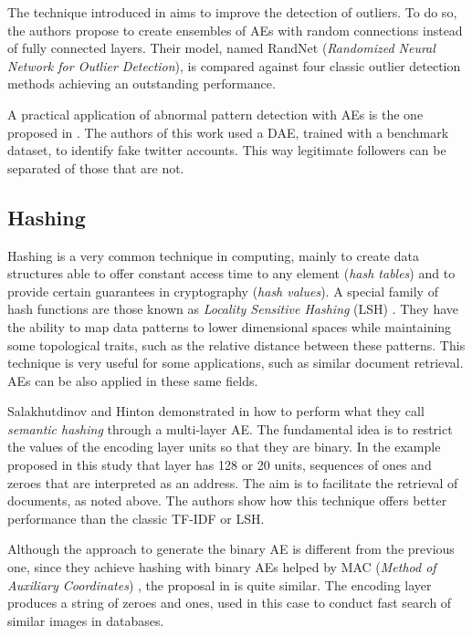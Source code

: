 The technique introduced in  aims to improve the detection of outliers. To do so, the authors propose to create ensembles of AEs with random connections instead of fully connected layers. Their model, named RandNet (\textit{Randomized Neural Network for Outlier Detection}), is compared against four classic outlier detection methods achieving an outstanding performance.

A practical application of abnormal pattern detection with AEs is the one proposed in . The authors of this work used a DAE, trained with a benchmark dataset, to identify fake twitter accounts. This way legitimate followers can be separated of those that are not.

\subsection{Hashing}\label{p1Sect.Hashing}
Hashing  is a very common technique in computing, mainly to create data structures able to offer constant access time to any element (\textit{hash tables}) and to provide certain guarantees in cryptography (\textit{hash values}). A special family of hash functions are those known as \textit{Locality Sensitive Hashing} (LSH) . They have the ability to map data patterns to lower dimensional spaces while maintaining some topological traits, such as the relative distance between these patterns. This technique is very useful for some applications, such as similar document retrieval. AEs can be also applied in these same fields.

Salakhutdinov and Hinton demonstrated in  how to perform what they call \textit{semantic hashing} through a multi-layer AE. The fundamental idea is to restrict the values of the encoding layer units so that they are binary. In the example proposed in this study that layer has 128 or 20 units, sequences of ones and zeroes that are interpreted as an address. The aim is to facilitate the retrieval of documents, as noted above. The authors show how this technique offers better performance than the classic TF-IDF  or LSH.

Although the approach to generate the binary AE is different from the previous one, since they achieve hashing with binary AEs helped by MAC (\textit{Method of Auxiliary Coordinates}) , the proposal in  is quite similar. The encoding layer produces a string of zeroes and ones, used in this case to conduct fast search of similar images in databases.

